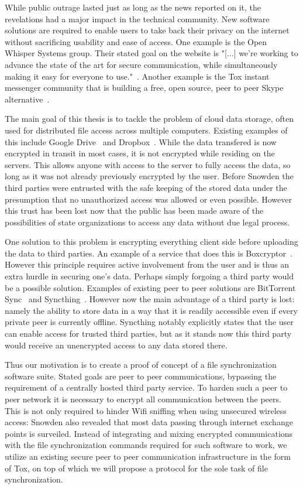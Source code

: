 While public outrage lasted just as long as the news reported on it, the revelations had a major impact in the technical community.
New software solutions are required to enable users to take back their privacy on the internet without sacrificing usability and ease of access.
One example is the Open Whisper Systems group.
Their stated goal on the website is "[...] we're working to advance the state of the art for secure communication, while simultaneously making it easy for everyone to use."~\cite{web:site:whispersystems}.
Another example is the Tox instant messenger community that is building a free, open source, peer to peer Skype alternative~\cite{web:site:tox}.

The main goal of this thesis is to tackle the problem of cloud data storage, often used for distributed file access across multiple computers.
Existing examples of this include Google Drive~\cite{web:site:gdrive} and Dropbox~\cite{web:site:dropbox}.
While the data transfered is now encrypted in transit in most cases, it is not encrypted while residing on the servers.
This allows anyone with access to the server to fully access the data, so long as it was not already previously encrypted by the user.
Before Snowden the third parties were entrusted with the safe keeping of the stored data under the presumption that no unauthorized access was allowed or even possible.
However this trust has been lost now that the public has been made aware of the possibilities of state organizations to access any data without due legal process.

One solution to this problem is encrypting everything client side before uploading the data to third parties.
An example of a service that does this is Boxcryptor~\cite{web:site:boxcryptor}.
However this principle requires active involvement from the user and is thus an extra hurdle in securing one's data.
Perhaps simply forgoing a third party would be a possible solution.
Examples of existing peer to peer solutions are BitTorrent Sync~\cite{web:site:bittorrent_sync} and Syncthing~\cite{web:site:synthing}.
However now the main advantage of a third party is lost: namely the ability to store data in a way that it is readily accessible even if every private peer is currently offline.
Syncthing notably explicitly states that the user can enable access for trusted third parties, but as it stands now this third party would receive an unencrypted access to any data stored there.

Thus our motivation is to create a proof of concept of a file synchronization software suite.
Stated goals are peer to peer communications, bypassing the requirement of a centrally hosted third party service.
To harden such a peer to peer network it is necessary to encrypt all communication between the peers.
This is not only required to hinder Wifi sniffing when using unsecured wireless access: Snowden also revealed that most data passing through internet exchange points is surveiled\cite{web:site:heise:decix}.
Instead of integrating and mixing encrypted communications with the file synchronization commands required for such software to work, we utilize an existing secure peer to peer communication infrastructure in the form of Tox, on top of which we will propose a protocol for the sole task of file synchronization.

